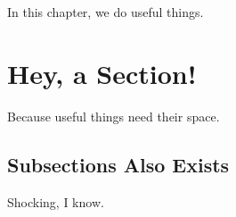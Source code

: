 
In this chapter, we do useful things.

\section{Hey, a Section!}

Because useful things need their space.

\subsection{Subsections Also Exists}

Shocking, I know.